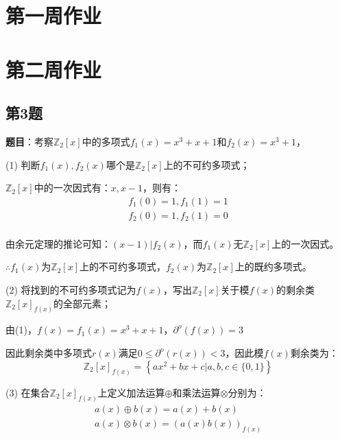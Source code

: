 \chapter{第一周作业}

\newpage
\chapter{第二周作业}

\section{第3题}

\textbf{题目}：考察$\mathbb{Z}_2[x]$中的多项式$f_1(x)=x^3+x+1$和$f_2(x)=x^3+1$，


(1) 判断$f_1(x),f_2(x)$哪个是$\mathbb{Z}_2[x]$上的不可约多项式；

\begin{Solution}
    $\mathbb{Z}_2[x]$中的一次因式有：$x,x-1$，则有：
    \begin{equation}
        \begin{aligned}
            f_1(0) = 1, f_1(1) = 1\\
            f_2(0) = 1, f_2(1) = 0\\
        \end{aligned}
    \end{equation}
    
    由余元定理的推论可知：$(x-1)|f_2(x)$，而$f_1(x)$无$\mathbb{Z}_2[x]$上的一次因式。
    
    $\therefore f_1(x)$为$\mathbb{Z}_2[x]$上的不可约多项式，$f_2(x)$为$\mathbb{Z}_2[x]$上的既约多项式。
\end{Solution}

(2) 将找到的不可约多项式记为$f(x)$，写出$\mathbb{Z}_2[x]$关于模$f(x)$的剩余类$\mathbb{Z}_2[x]_{f(x)}$的全部元素；

\begin{Solution}
    由(1)，$f(x)=f_1(x)=x^3+x+1$，$\partial^o(f(x))=3$
    
    因此剩余类中多项式$r(x)$满足$0\le \partial^o(r(x)) < 3$，因此模$f(x)$剩余类为：
    \begin{equation}
        \mathbb{Z}_2[x]_{f(x)} = \left\{ax^2+bx+c|a,b,c \in \{0,1\}\right\}
    \end{equation}
\end{Solution}

(3) 在集合$\mathbb{Z}_2[x]_{f(x)}$上定义加法运算$\oplus$和乘法运算$\otimes$分别为：
\begin{equation}
    \begin{aligned}
        a(x) \oplus b(x) = a(x) + b(x) \\
        a(x) \otimes b(x) = (a(x)b(x))_{f(x)}
    \end{aligned}
\end{equation}

